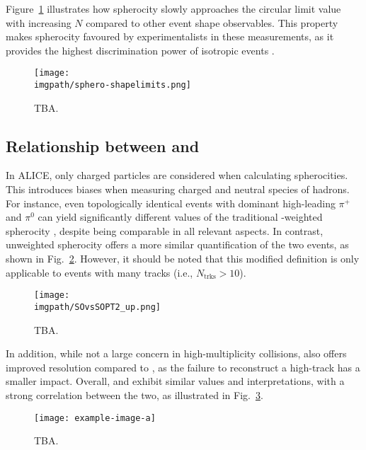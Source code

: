 Figure~\ref{fig:sphero:shapelimits} illustrates how spherocity slowly approaches the circular limit value with increasing $N$ compared to other event shape observables. This property makes spherocity favoured by experimentalists in these measurements, as it provides the highest discrimination power of isotropic events \cite{antonio-sphero-motivation}.

\begin{figure}%
\texttt{[image: \\imgpath/sphero-shapelimits.png]}
\caption{TBA.}
\label{fig:sphero:shapelimits}
\end{figure}


\subsection{Relationship between \SOPT and \SO}

In ALICE, only charged particles are considered when calculating spherocities. This introduces biases when measuring charged and neutral species of hadrons. For instance, even topologically identical events with dominant high-\pt leading $\pi^+$ and $\pi^0$ can yield significantly different values of the traditional \pt-weighted spherocity \SO, despite being comparable in all relevant aspects. In contrast, unweighted spherocity \SOPT offers a more similar quantification of the two events, as shown in Fig.~\ref{fig:sphero:sOvssOpt}. However, it should be noted that this modified definition is only applicable to events with many tracks (i.e., $N_{\textrm{trks}}>10$).

\begin{figure}%
\texttt{[image: \\imgpath/SOvsSOPT2\_up.png]}
\caption{TBA.}
\label{fig:sphero:sOvssOpt}
\end{figure}

In addition, while not a large concern in high-multiplicity collisions\cite{alice-sphero-nch}, \SOPT also offers improved resolution compared to \SO, as the failure to reconstruct a high-\pt track has a smaller impact. Overall, \SO and \SOPT exhibit similar values and interpretations, with a strong correlation between the two, as illustrated in Fig.~\ref{fig:sphero:sOvssOptcorr}.

\begin{figure}%
\texttt{[image: example-image-a]}
\caption{TBA.}
\label{fig:sphero:sOvssOptcorr}
\end{figure}

